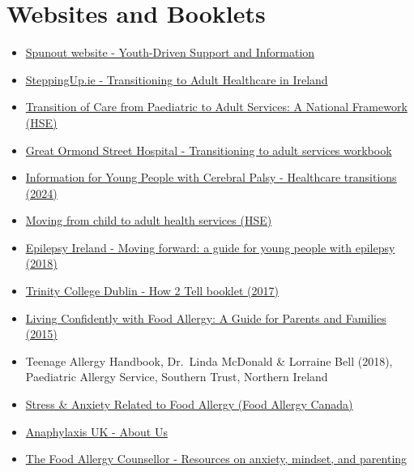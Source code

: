 \documentclass[MScCS]{uccthesis}
\begin{document}
\section*{Websites and Booklets}
\begin{itemize}
    \item \href{https://spunout.ie/}{Spunout website - Youth-Driven Support and Information}
    \item \href{https://steppingup.ie/}{SteppingUp.ie - Transitioning to Adult Healthcare in Ireland}
    \item \href{https://www.hse.ie/eng/about/who/cspd/transition-of-care/toc-framework.pdf}{Transition of Care from Paediatric to Adult Services: A National Framework (HSE)}
    \item \href{https://media.gosh.nhs.uk/documents/Booklet.PDF}{Great Ormond Street Hospital - Transitioning to adult services workbook}
    \item \href{https://cphealthcaretransition.eu/wp-content/uploads/2024/08/Information-booklet-for-young-people-1.pdf}{Information for Young People with Cerebral Palsy - Healthcare transitions (2024)}
    \item \href{https://www2.hse.ie/services/moving-from-child-to-adult-health-services/}{Moving from child to adult health services (HSE)}
    \item \href{https://www.epilepsy.ie/sites/www.epilepsy.ie/files/Teens_Booklet\%202018.pdf}{Epilepsy Ireland - Moving forward: a guide for young people with epilepsy (2018)}
    \item \href{https://www.epilepsy.ie/sites/www.epilepsy.ie/files/How2tell_BOOKLET.pdf}{Trinity College Dublin - How 2 Tell booklet (2017)}
    \item \href{https://foodallergycanada.ca/wp-content/uploads/NDHB_eng_web.pdf}{Living Confidently with Food Allergy: A Guide for Parents and Families (2015)}
    \item Teenage Allergy Handbook, Dr.~Linda McDonald \& Lorraine Bell (2018), Paediatric Allergy Service, Southern Trust, Northern Ireland
    \item \href{https://foodallergycanada.ca/wp-content/uploads/6_StressAndAnxiety-Web.pdf}{Stress \& Anxiety Related to Food Allergy (Food Allergy Canada)}
    \item \href{https://www.anaphylaxis.org.uk/about-us/}{Anaphylaxis UK - About Us}
    \item \href{https://www.foodallergycounselor.com/}{The Food Allergy Counsellor - Resources on anxiety, mindset, and parenting}
\end{itemize}
\end{document}
